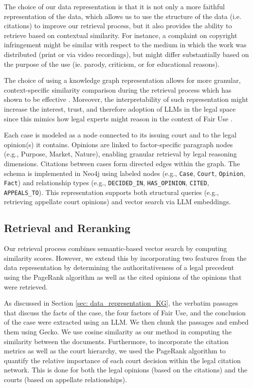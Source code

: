 The choice of our data representation is that it is not only a more faithful representation of the data, which allows us to use the structure of the data (i.e. citations) to improve our retrieval process, but it also provides the ability to retrieve based on contextual similarity. For instance, a complaint on copyright infringement might be similar with respect to the medium in which the work was distributed (print or via video recordings), but might differ substantially based on the purpose of the use (ie. parody, criticism, or for educational reasons). 

The choice of using a knowledge graph representation allows for more granular, context-specific similarity comparison during the retrieval process which has shown to be effective \cite{02_DenseRetrieval, 03b_SemanticRepresentationContextual}. Moreover, the interpretability of such representation might increase the interest, trust, and therefore adoption of LLMs in the legal space since this mimics how legal experts might reason in the context of Fair Use \cite{18_TrustAIExplainability}.

Each case is modeled as a node connected to its issuing court and to the legal opinion(s) it contains. Opinions are linked to factor-specific paragraph nodes (e.g., Purpose, Market, Nature), enabling granular retrieval by legal reasoning dimensions. Citations between cases form directed edges within the graph. The schema is implemented in Neo4j using labeled nodes (e.g., \texttt{Case}, \texttt{Court}, \texttt{Opinion}, \texttt{Fact}) and relationship types (e.g., \texttt{DECIDED\_IN}, \texttt{HAS\_OPINION}, \texttt{CITED}, \texttt{APPEALS\_TO}). This representation supports both structural queries (e.g., retrieving appellate court opinions) and vector search via LLM embeddings.

\subsection{Retrieval and Reranking}

Our retrieval process combines semantic-based vector search by computing similarity scores. However, we extend this by incorporating two features from the data representation by determining the authoritativeness of a legal precedent using the PageRank algorithm as well as the cited opinions of the opinions that were retrieved.

As discussed in Section \ref{sec: data_representation_KG}, the verbatim passages that discuss the facts of the case, the four factors of Fair Use, and the conclusion of the case were extracted using an LLM. We then chunk the passages and embed them using Gecko. We use cosine similarity as our method in computing the similarity between the documents. Furthermore, to incorporate the citation metrics as well as the court hierarchy, we used the PageRank algorithm to quantify the relative importance of each court decision within the legal citation network. This is done for both the legal opinions (based on the citations) and the courts (based on appellate relationships). 

